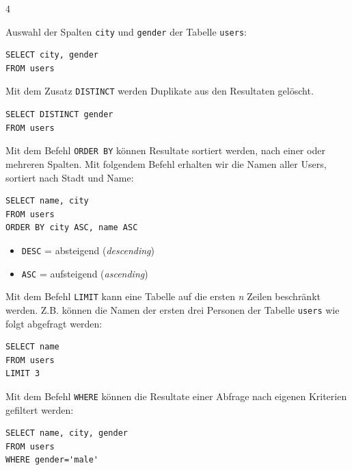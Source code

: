\begin{landscape}
\begin{multicols*}{4}
\begin{cheatSheetBox}[title=Spalten auswählen: \texorpdfstring{\lstinline|SELECT|}{SELECT}]
Auswahl der Spalten \texttt{city} und \texttt{gender} der Tabelle \texttt{users}:
\begin{lstlisting}
SELECT city, gender
FROM users
\end{lstlisting}
\end{cheatSheetBox}

\begin{cheatSheetBox}[title=Duplikate löschen: \texorpdfstring{\lstinline|DISTINCT|}{DISTINCT}]
Mit dem Zusatz \lstinline|DISTINCT| werden Duplikate aus den Resultaten gelöscht.
\begin{lstlisting}
SELECT DISTINCT gender
FROM users
\end{lstlisting}
\end{cheatSheetBox}

\begin{cheatSheetBox}[title=Sortieren: \texorpdfstring{\lstinline|ORDER BY|}{ORDER BY}]
Mit dem Befehl \lstinline|ORDER BY| können Resultate sortiert werden, nach einer oder mehreren Spalten. Mit folgendem Befehl erhalten wir die Namen aller Users, sortiert nach Stadt und Name:
\begin{lstlisting}
SELECT name, city
FROM users
ORDER BY city ASC, name ASC
\end{lstlisting}
\begin{itemize}
\item \lstinline|DESC| = absteigend (\textit{descending})
\item \lstinline|ASC| = aufsteigend (\textit{ascending})
\end{itemize}
\end{cheatSheetBox}

\begin{cheatSheetBox}[title=Erste / Letzte Zeilen: \texorpdfstring{\lstinline|LIMIT|}{LIMIT}]
Mit dem Befehl \lstinline|LIMIT| kann eine Tabelle auf die ersten \textit{n} Zeilen beschränkt werden. Z.B. können die Namen der ersten drei Personen der Tabelle \texttt{users} wie folgt abgefragt werden:
\begin{lstlisting}
SELECT name
FROM users
LIMIT 3
\end{lstlisting}
\end{cheatSheetBox}

\begin{cheatSheetBox}[title=Zeilen filtern: \texorpdfstring{\lstinline|WHERE|}{WHERE}]
Mit dem Befehl \lstinline|WHERE| können die Resultate einer Abfrage nach eigenen Kriterien gefiltert werden:
\begin{lstlisting}
SELECT name, city, gender
FROM users
WHERE gender='male'
\end{lstlisting}


\end{cheatSheetBox}
\end{multicols*}
\end{landscape}
